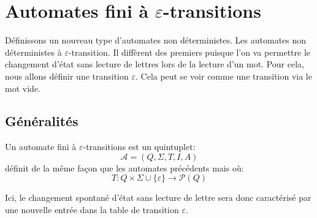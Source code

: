 
\section{Automates fini à $\varepsilon$-transitions}

Définissons un nouveau type d'automates non déterministes. Les automates non déterministes à $\varepsilon$-transition. 
Il diffèrent des premiers puisque l'on va permettre le changement d'état sans lecture de lettres lors 
de la lecture d'un mot. Pour cela, nous allons définir une transition $\varepsilon$. 
Cela peut se voir comme une transition via le mot vide. 

\subsection{Généralités}

\begin{definition}
    Un automate fini à $\varepsilon$-transitions est un quintuplet: 
        \[ \mathcal{A} = (Q,\Sigma, T, I, A) \] 
    définit de la même façon que les automates précédents mais où: 
        \[ T : Q \times \Sigma \cup \{\varepsilon\} \longrightarrow \mathcal{P}(Q) \] 
\end{definition}

Ici, le changement spontané d'état sans lecture de lettre sera donc caractérisé par une nouvelle 
entrée dans la table de transition $\varepsilon$. 

